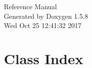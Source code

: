 \documentclass[a4paper]{book}
\begin{document}
\begin{titlepage}
\vspace*{7cm}
\begin{center}
{\Large Reference Manual}\\
\vspace*{1cm}
{\large Generated by Doxygen 1.5.8}\\
\vspace*{0.5cm}
{\small Wed Oct 25 12:41:32 2017}\\
\end{center}
\end{titlepage}
\clearemptydoublepage
{}
\tableofcontents
\clearemptydoublepage
{}
\chapter{Class Index}

\end{document}
